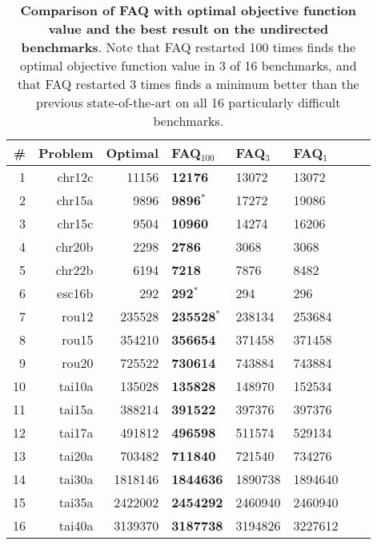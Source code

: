 \documentclass[10pt]{article}
\begin{document}
\begin{table}[h!]
\caption{{\bf Comparison of FAQ with optimal objective function value and the best result  on the undirected benchmarks}.  Note that FAQ restarted 100 times finds the optimal objective function value in 3 of 16 benchmarks, and that FAQ restarted 3 times finds a minimum better than the previous state-of-the-art on all 16 particularly difficult benchmarks.}
\begin{center}
\begin{tabular}{|r|r|r||l|l|l|l|l|}
\hline
\# & Problem  &   Optimal    & FAQ$_{100}$ & FAQ$_{3}$ & FAQ$_1$\\
\hline
1&    chr12c &   11156 &    \textbf{12176} &   13072 & 13072 \\
2&    chr15a &    9896 &    \textbf{9896}$^*$ &   17272 &  19086 \\
3&    chr15c &    9504 &    \textbf{10960} &   14274 &  16206 \\
4&   chr20b &    2298 &     \textbf{2786} &    3068 &    3068 \\
5&    chr22b &    6194 &    \textbf{7218} &    7876 &   8482 \\
6&    esc16b & 	292 & 		\textbf{292}$^*$ & 294 &    296 \\
7& 	   rou12 &  235528 &  \textbf{235528}$^*$ &  238134 &    253684 \\
8& 	   rou15 &  354210 &  \textbf{356654} &  371458 &    371458 \\
9&      rou20 &  725522 &  \textbf{730614} &  743884 &    743884 \\
10&    tai10a &  135028 &  \textbf{135828} &  148970 &    152534 \\
11&    tai15a &  388214 &  \textbf{391522} &  397376 &    397376 \\
12&    tai17a &  491812 &  \textbf{496598} &  511574 &    529134 \\
13&    tai20a &  703482 &  \textbf{711840} &  721540 &    734276 \\
14&    tai30a & 1818146 & \textbf{1844636} & 1890738 &  1894640 \\
15&    tai35a & 2422002 & \textbf{2454292} & 2460940 &  2460940 \\
16&    tai40a & 3139370 & \textbf{3187738} & 3194826 &  3227612 \\
    \hline
\end{tabular}
\end{center}
\label{tab:restarts}
\end{table}
\end{document}
